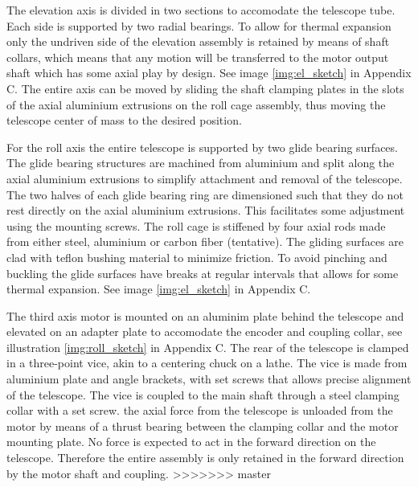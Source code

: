 The elevation axis is divided in two sections to accomodate the telescope tube. Each side is supported by two radial bearings. To allow for thermal expansion only the undriven side of the elevation assembly is retained by means of shaft collars, which means that any motion will be transferred to the motor output shaft which has some axial play by design. See image \ref{img:el_sketch} in Appendix C. The entire axis can be moved by sliding the shaft clamping plates in the slots of the axial aluminium extrusions on the roll cage assembly, thus moving the telescope center of mass to the desired position.

For the roll axis the entire telescope is supported by two glide bearing surfaces. The glide bearing structures are machined from  aluminium and split along the axial aluminium extrusions to simplify attachment and removal of the telescope. The  two halves of each glide bearing ring are dimensioned such that they do not rest directly on the axial aluminium extrusions. This facilitates some adjustment using the mounting screws. The roll cage is stiffened by four axial rods made from either steel, aluminium or carbon fiber (tentative). The gliding surfaces are clad with teflon bushing material to minimize friction. To avoid pinching and buckling the glide surfaces have breaks at regular intervals that allows for some thermal expansion. See image \ref{img:el_sketch} in Appendix C. 

The third axis motor is mounted on an aluminim plate behind the telescope and elevated on an adapter plate to accomodate the encoder and coupling collar, see illustration \ref{img:roll_sketch} in Appendix C. The rear of the telescope is clamped in a three-point vice, akin to a centering chuck on a lathe. The vice is made from aluminium plate and angle brackets, with set screws that allows precise alignment of the telescope. The vice is coupled to the main shaft through a steel clamping collar with a set screw. the axial force from the telescope is unloaded from the motor by means of a thrust bearing between the clamping collar and the motor mounting plate. No force is expected to act in the forward direction on the telescope. Therefore the entire assembly is only retained in the forward direction by the motor shaft and coupling.
>>>>>>> master

